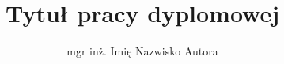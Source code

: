 \documentclass[eng]{sep} %
\title{Tytuł pracy dyplomowej}
\author{mgr inż. Imię Nazwisko Autora}
\begin{document}
\maketitle
\begin{spacing}{1.125}





\end{spacing}
\printbibliography
\end{document}
